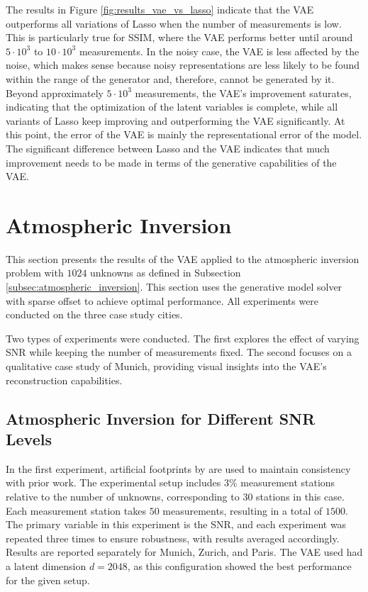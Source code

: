 The results in Figure \ref{fig:results_vae_vs_lasso} indicate that the \gls{VAE} outperforms all variations of \gls{Lasso} when the number of measurements is low.
This is particularly true for \gls{SSIM}, where the \gls{VAE} performs better until around $5 \cdot 10^{3}$ to $10 \cdot 10^{3}$ measurements.
In the noisy case, the \gls{VAE} is less affected by the noise, which makes sense because noisy representations are less likely to be found within the range of the generator and, therefore, cannot be generated by it.
Beyond approximately $5 \cdot 10^{3}$ measurements, the \gls{VAE}'s improvement saturates, indicating that the optimization of the latent variables is complete, while all variants of \gls{Lasso} keep improving and outperforming the \gls{VAE} significantly.
At this point, the error of the \gls{VAE} is mainly the representational error of the model.
The significant difference between \gls{Lasso} and the \gls{VAE} indicates that much improvement needs to be made in terms of the generative capabilities of the \gls{VAE}.

\section{Atmospheric Inversion}\label{section:atmospheric_inversion_results}
This section presents the results of the \gls{VAE} applied to the atmospheric inversion problem with $1024$ unknowns as defined in Subsection \ref{subsec:atmospheric_inversion}.
This section uses the generative model solver with sparse offset to achieve optimal performance.
All experiments were conducted on the three case study cities.

Two types of experiments were conducted.
The first explores the effect of varying \gls{SNR} while keeping the number of measurements fixed.
The second focuses on a qualitative case study of Munich, providing visual insights into the \gls{VAE}'s reconstruction capabilities.

\subsection{Atmospheric Inversion for Different SNR Levels}
In the first experiment, artificial footprints by \textcite{UrbanSparseReconstructionFootprints} are used to maintain consistency with prior work.
The experimental setup includes $3\%$ measurement stations relative to the number of unknowns, corresponding to $30$ stations in this case.
Each measurement station takes $50$ measurements, resulting in a total of $1500$.
The primary variable in this experiment is the \gls{SNR}, and each experiment was repeated three times to ensure robustness, with results averaged accordingly.
Results are reported separately for Munich, Zurich, and Paris.
The \gls{VAE} used had a latent dimension $d = 2048$, as this configuration showed the best performance for the given setup.


